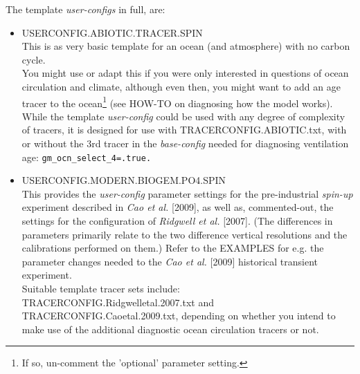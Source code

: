 \documentclass[11pt,fleqn]{book} %
\begin{document}
\vspace{2mm}

The template \textit{user-configs} in full, are:

\begin{itemize}[noitemsep]

\vspace{2mm}
\item \textsf{\small USERCONFIG.ABIOTIC.TRACER.SPIN}
\vspace{1mm}
\\This is as very basic template for an ocean (and atmosphere) with no carbon cycle.
\\You might use or adapt this if you were only interested in questions of ocean circulation and climate, although even then, you might want to add an age tracer to the ocean\footnote{If so, un-comment the 'optional' parameter setting.} (see HOW-TO on diagnosing how the model works).\\While the template \textit{user-config} could be used with any degree of complexity of tracers, it is designed for use with \textsf{\footnotesize TRACERCONFIG.ABIOTIC.txt}, with or without the 3rd tracer in the \textit{base-config} needed for diagnosing ventilation age: \texttt{gm\_ocn\_select\_4=.true.}

\vspace{2mm}
\item \textsf{\small USERCONFIG.MODERN.BIOGEM.PO4.SPIN}
\vspace{1mm}
\\This provides the \textit{user-config} parameter settings for the pre-industrial \textit{spin-up} experiment described in \textit{Cao et al.} [2009], as well as, commented-out, the settings for the configuration of \textit{Ridgwell et al.} [2007]. (The differences in parameters primarily relate to the two difference vertical resolutions and the calibrations performed on them.) Refer to the EXAMPLES for e.g. the parameter changes needed to the \textit{Cao et al.} [2009] historical transient experiment.
\\Suitable template tracer sets include: \textsf{\footnotesize TRACERCONFIG.Ridgwelletal.2007.txt} and \linebreak \textsf{\footnotesize TRACERCONFIG.Caoetal.2009.txt}, depending on whether you intend to make use of the additional diagnostic ocean circulation tracers or not.


\end{itemize}
\end{document}
